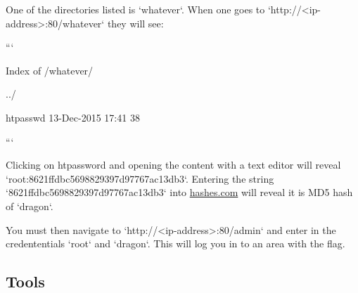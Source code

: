 One of the directories listed is `whatever`. When one goes to `http://<ip-address>:80/whatever` they will see:

```

Index of /whatever/

../

htpasswd                                           13-Dec-2015 17:41                  38

```

Clicking on htpassword and opening the content with a text editor will reveal `root:8621ffdbc5698829397d97767ac13db3`. Entering the string `8621ffdbc5698829397d97767ac13db3` into \href{https://hashes.com/en/decrypt/hash}{hashes.com} will reveal it is MD5 hash of `dragon`.

You must then navigate to `http://<ip-address>:80/admin` and enter in the credententials `root` and `dragon`. This will log you in to an area with the flag.

\subsection{Tools}

